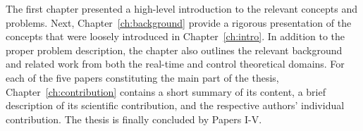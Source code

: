 The first chapter presented a high-level introduction to the relevant concepts and problems.
Next, Chapter~\ref{ch:background} provide a rigorous presentation of the concepts that were loosely introduced in Chapter~\ref{ch:intro}.
In addition to the proper problem description, the chapter also outlines the relevant background and related work from both the real-time and control theoretical domains.
For each of the five papers constituting the main part of the thesis, Chapter~\ref{ch:contribution} contains a short summary of its content, a brief description of its scientific contribution, and the respective authors' individual contribution.
The thesis is finally concluded by Papers I-V. 
